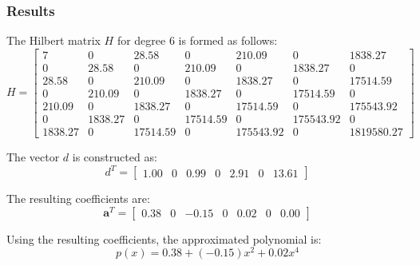 \documentclass[10pt]{article}
\begin{document}
\subsubsection{Results}

The Hilbert matrix \( H \) for degree 6 is formed as follows:
\[
H = \begin{bmatrix}
7 & 0 & 28.58 & 0 & 210.09 & 0 & 1838.27 \\
0 & 28.58 & 0 & 210.09 & 0 & 1838.27 & 0 \\
28.58 & 0 & 210.09 & 0 & 1838.27 & 0 & 17514.59 \\
0 & 210.09 & 0 & 1838.27 & 0 & 17514.59 & 0 \\
210.09 & 0 & 1838.27 & 0 & 17514.59 & 0 & 175543.92 \\
0 & 1838.27 & 0 & 17514.59 & 0 & 175543.92 & 0 \\
1838.27 & 0 & 17514.59 & 0 & 175543.92 & 0 & 1819580.27
\end{bmatrix}
\]

The vector \( d \) is constructed as:
\[
d^T = \begin{bmatrix}
1.00 & 0 & 0.99 & 0 & 2.91 & 0 & 13.61
\end{bmatrix}
\]

The resulting coefficients are:
\[
\mathbf{a}^T = \begin{bmatrix}
0.38 & 0 & -0.15 & 0 & 0.02 & 0 & 0.00
\end{bmatrix}
\]

Using the resulting coefficients, the approximated polynomial is:
\begin{equation}
p(x) = 0.38 + (-0.15)x^2 + 0.02x^4
\end{equation}
\end{document}

